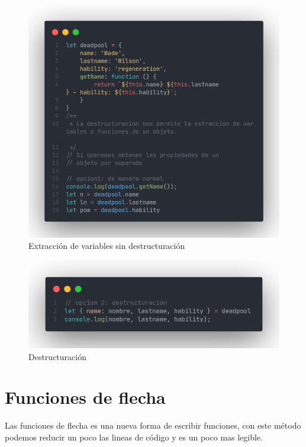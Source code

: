 \documentclass[12pt]{article}
\begin{document}
\begin{figure}[H]
	\centering
	\includegraphics[scale=0.25]{assets/images/destructuracion-1.png}
	\caption{Extracción de variables sin destructuración	}								    
\end{figure}
		
\begin{figure}[H]
	\centering
	\includegraphics[scale=0.25]{assets/images/destructuracion-2.png}
	\caption{Destructuración}									    
\end{figure}
		
		
\section{Funciones de flecha}

Las funciones de flecha es una nueva forma de escribir funciones, con este método podemos reducir un poco las lineas de código y es un poco mas legible.
\end{document}
